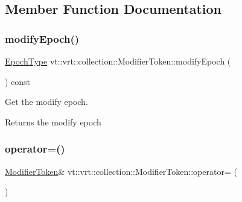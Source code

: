 \subsection{Member Function Documentation}
\mbox{\label{structvt_1_1vrt_1_1collection_1_1_modifier_token_a2a87237f09095f3284a5ebea7b9976e9}} 
\subsubsection{\texorpdfstring{modify\+Epoch()}{modifyEpoch()}}
{\footnotesize\ttfamily \hyperlink{namespacevt_a985a5adf291c34a3ca263b3378388236}{Epoch\+Type} vt\+::vrt\+::collection\+::\+Modifier\+Token\+::modify\+Epoch (\begin{DoxyParamCaption}{ }\end{DoxyParamCaption}) const\hspace{0.3cm}{\ttfamily [inline]}}



Get the modify epoch. 

\begin{DoxyReturn}{Returns}
the modify epoch 
\end{DoxyReturn}
\mbox{\label{structvt_1_1vrt_1_1collection_1_1_modifier_token_ae5bb7550e56586506bf2823603023109}} 
\subsubsection{\texorpdfstring{operator=()}{operator=()}\hspace{0.1cm}{\footnotesize\ttfamily [1/2]}}
{\footnotesize\ttfamily \hyperlink{structvt_1_1vrt_1_1collection_1_1_modifier_token}{Modifier\+Token}\& vt\+::vrt\+::collection\+::\+Modifier\+Token\+::operator= (\begin{DoxyParamCaption}\item[{\hyperlink{structvt_1_1vrt_1_1collection_1_1_modifier_token}{Modifier\+Token} const \&}]{ }\end{DoxyParamCaption})\hspace{0.3cm}{\ttfamily [delete]}}

